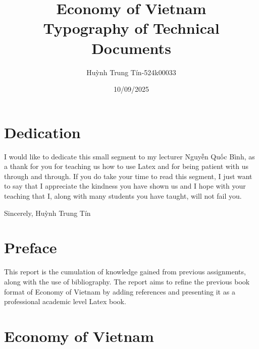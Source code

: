 \documentclass[openany]{book}
\title{Economy of Vietnam\\ \normalsize Typography of Technical Documents}
\author{Huỳnh Trung Tín-524k00033}
\date{10/09/2025}
\makeatletter
\renewcommand\mainmatter{%
    \clearpage
  \@mainmattertrue
  \pagenumbering{arabic}}
\makeatother
\begin{document}
\frontmatter
\maketitle
\chapter*{Dedication}
I would like to dedicate this small segment to my lecturer Nguyễn Quốc Bình, as a thank for you for teaching us how to use Latex and for being patient with us through and through. If you do take your time to read this segment, I just want to say that I appreciate the kindness you have shown us and I hope with your teaching that I, along with many students you have taught, will not fail you.

Sincerely, Huỳnh Trung Tín
\clearpage
\chapter*{Preface}
This report is the cumulation of knowledge gained from previous assignments, along with the use of bibliography. The report aims to refine the previous book format of Economy of Vietnam by adding references and presenting it as a professional academic level Latex book.
\tableofcontents
\mainmatter
\chapter{Economy of Vietnam}
\end{document}
